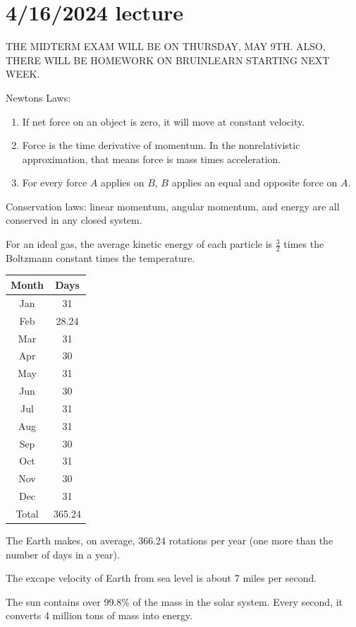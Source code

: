 \documentclass[class=article, crop=false]{standalone}
\begin{document}
\section{4/16/2024 lecture}
THE MIDTERM EXAM WILL BE ON THURSDAY, MAY 9TH. ALSO, THERE WILL BE HOMEWORK ON BRUINLEARN STARTING NEXT WEEK.
\par
Newtons Laws:
\begin{enumerate}
    \item If net force on an object is zero, it will move at constant velocity.
    \item Force is the time derivative of momentum. In the nonrelativistic approximation, that means force is mass times acceleration.
    \item For every force $A$ applies on $B$, $B$ applies an equal and opposite force on $A$.
\end{enumerate}
Conservation laws: linear momentum, angular momentum, and energy are all conserved in any closed system.
\par
For an ideal gas, the average kinetic energy of each particle is $ \frac{3}{2}$ times the Boltzmann constant times the temperature.
\par
\begin{center}
    \begin{tabular}{ |c|c| } 
    \hline
    Month & Days \\
    \hline
    \hline
    Jan & 31 \\
    \hline
    Feb & 28.24 \\
    \hline
    Mar & 31 \\
    \hline
    Apr & 30 \\
    \hline
    May & 31 \\
    \hline
    Jun & 30 \\
    \hline
    Jul & 31 \\
    \hline
    Aug & 31 \\
    \hline
    Sep & 30 \\
    \hline
    Oct & 31 \\
    \hline
    Nov & 30 \\
    \hline
    Dec & 31 \\
    \hline
    \hline
    Total & 365.24 \\
    \hline
\end{tabular}
\end{center}
\begin{note}
    The Earth makes, on average, 366.24 rotations per year (one more than the number of days in a year).
\end{note}
\par
The excape velocity of Earth from sea level is about 7 miles per second.
\par
The sun contains over 99.8\% of the mass in the solar system. Every second, it converts 4 million tons of mass into energy.
\end{document}
